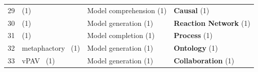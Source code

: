\begin{tabular} { p{} p{} p{} p{} }
29& \cite{gandee2024combining} (1) & \cellcolor[HTML]{E4EDD4}Model comprehension (1) & \textbf{Causal} (1) \cite{ \papertwohundredthirtysecond }\\ 
\rowcolor{gray!15} 
30& \cite{geng2023grammar} (1) & \cellcolor[HTML]{D1F1E3}Model generation (1) & \textbf{Reaction Network} (1) \cite{ \papertwohundredfortyfourth }\\ 
31& \cite{si2013improving} (1) & \cellcolor[HTML]{EBEBD3}Model completion (1) & \textbf{Process} (1) \cite{ \paperninetysixth }\\ 
\rowcolor{gray!15} 
32& metaphactory~\cite{haase2019metaphactory} (1) & \cellcolor[HTML]{D1F1E3}Model generation (1) & \textbf{Ontology} (1) \cite{ \papertwohundredfortyseventh }\\ 
33& vPAV~\cite{schneid2021data} (1) & \cellcolor[HTML]{D1F1E3}Model generation (1) & \textbf{Collaboration} (1) \cite{ \paperonehundredninetyfourth }\\ 
\bottomrule 
\end{tabular} 
